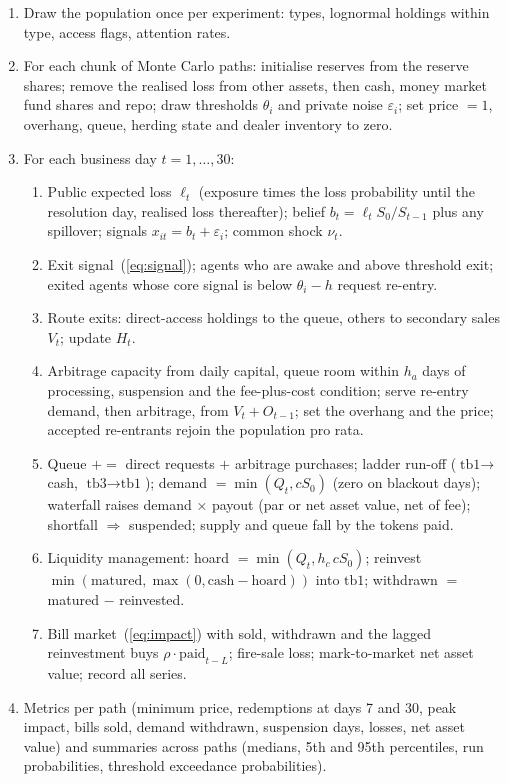 \begin{small}
\begin{enumerate}\setlength{\itemsep}{0pt}
\item Draw the population once per experiment: types, lognormal holdings within type, access flags, attention rates.
\item For each chunk of Monte Carlo paths: initialise reserves from the reserve shares; remove the realised loss from
  other assets, then cash, money market fund shares and repo; draw thresholds $\theta_i$ and private noise
  $\varepsilon_i$; set price $=1$, overhang, queue, herding state and dealer inventory to zero.
\item For each business day $t=1,\dots,30$:
  \begin{enumerate}\setlength{\itemsep}{0pt}
  \item Public expected loss $\ell_t$ (exposure times the loss probability until the resolution day, realised loss
    thereafter); belief $b_t=\ell_t S_0/S_{t-1}$ plus any spillover; signals $x_{it}=b_t+\varepsilon_i$; common
    shock $\nu_t$.
  \item Exit signal~(\ref{eq:signal}); agents who are awake and above threshold exit; exited agents whose core signal
    is below $\theta_i-h$ request re-entry.
  \item Route exits: direct-access holdings to the queue, others to secondary sales $V_t$; update $H_t$.
  \item Arbitrage capacity from daily capital, queue room within $h_a$ days of processing, suspension and the
    fee-plus-cost condition; serve re-entry demand, then arbitrage, from $V_t+O_{t-1}$; set the overhang and
    the price; accepted re-entrants rejoin the population pro rata.
  \item Queue $+=$ direct requests $+$ arbitrage purchases; ladder run-off ($\text{tb1}\to$ cash,
    $\text{tb3}\to\text{tb1}$); demand $=\min(Q_t, cS_0)$ (zero on blackout days); waterfall raises
    demand $\times$ payout (par or net asset value, net of fee); shortfall $\Rightarrow$ suspended; supply and queue fall
    by the tokens paid.
  \item Liquidity management: hoard $=\min(Q_t, h_c\, cS_0)$; reinvest $\min(\text{matured}, \max(0,\text{cash}-\text{hoard}))$
    into $\text{tb1}$; withdrawn $=$ matured $-$ reinvested.
  \item Bill market~(\ref{eq:impact}) with sold, withdrawn and the lagged reinvestment buys $\rho\cdot\text{paid}_{t-L}$;
    fire-sale loss; mark-to-market net asset value; record all series.
  \end{enumerate}
\item Metrics per path (minimum price, redemptions at days 7 and 30, peak impact, bills sold, demand withdrawn,
  suspension days, losses, net asset value) and summaries across paths (medians, 5th and 95th percentiles, run
  probabilities, threshold exceedance probabilities).
\end{enumerate}
\end{small}

